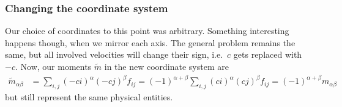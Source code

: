 \subsubsection{Changing the coordinate system}
\label{subs: Changing the coordinate system}
Our choice of coordinates to this point was arbitrary.
Something interesting happens though, when we mirror each axis.
The general problem remains the same, but all involved velocities will change their sign, i.e.\ $c$ gets replaced with $-c$.
Now, our moments $\tilde{m}$ in the new coordinate system are
\begin{align}
  \tilde{m}_{\alpha\beta} &= \sum_{i,j} {(-ci)}^\alpha {(-cj)}^\beta f_{ij}
  ={(-1)}^{\alpha + \beta} \sum_{i,j} {(ci)}^\alpha {(cj)}^\beta f_{ij}
  ={(-1)}^{\alpha + \beta} m_{\alpha\beta}
\end{align}
but still represent the same physical entities.

